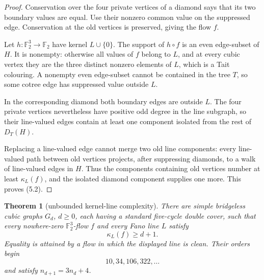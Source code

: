 \documentclass[11pt]{article}
\newtheorem{theorem}{Theorem}[section]
\theoremstyle{definition}
\theoremstyle{remark}
\newcommand{\F}{\mathbb F}
\begin{document}
\begin{proof}
Conservation over the four private vertices of a diamond says that its
two boundary values are equal.  Use their nonzero common value on the
suppressed edge.  Conservation at the old vertices is preserved, giving
the flow \(f\).

Let \(h:\F_2^3\to\F_2\) have kernel \(L\cup\{0\}\).  The support of
\(h\circ f\) is an even edge-subset of \(H\).  It is nonempty: otherwise
all values of \(f\) belong to \(L\), and at every cubic vertex they are
the three distinct nonzero elements of \(L\), which is a Tait colouring.
A nonempty even edge-subset cannot be contained in the tree \(T\), so
some cotree edge has suppressed value outside \(L\).

In the corresponding diamond both boundary edges are outside \(L\).
The four private vertices nevertheless have positive odd degree in the
line subgraph, so their line-valued edges contain at least one component
isolated from the rest of \(D_T(H)\).

Replacing a line-valued edge cannot merge two old line components: every
line-valued path between old vertices projects, after suppressing
diamonds, to a walk of line-valued edges in \(H\).  Thus the components
containing old vertices number at least \(\kappa_L(f)\), and the isolated
diamond component supplies one more.  This proves (5.2).
\end{proof}

\begin{theorem}[unbounded kernel-line complexity]
\label{thm:unbounded}
There are simple bridgeless cubic graphs \(G_d\), \(d\ge0\), each having
a standard five-cycle double cover, such that every nowhere-zero
\(\F_2^3\)-flow \(f\) and every Fano line \(L\) satisfy
\[
                              \kappa_L(f)\ge d+1.       \tag{5.3}
\]
Equality is attained by a flow in which the displayed line is clean.
Their orders begin
\[
                         10,34,106,322,\ldots
\]
and satisfy \(n_{d+1}=3n_d+4\).
\end{theorem}
\end{document}
